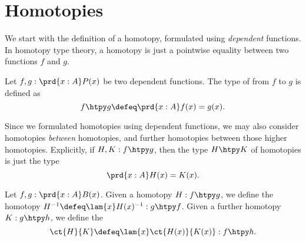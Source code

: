 \section{Homotopies}
We start with the definition of a homotopy, formulated using \emph{dependent} functions. In homotopy type theory, a homotopy is just a pointwise equality between two functions $f$ and $g$.

\begin{defn}
Let $f,g:\prd{x:A}P(x)$ be two dependent functions. The type of  from $f$ to $g$ is defined as
\begin{equation*}
f\htpy g \defeq \prd{x:A} f(x)=g(x).
\end{equation*}
\end{defn}

Since we formulated homotopies using dependent functions, we may also consider homotopies \emph{between} homotopies, and further homotopies between those higher homotopies. 
Explicitly, if $H,K:f\htpy g$, then the type $H\htpy K$ of homotopies is just the type
\begin{equation*}
\prd{x:A} H(x)=K(x).
\end{equation*}

\begin{defn}
Let $f,g:\prd{x:A}B(x)$. Given a homotopy $H:f\htpy g$, we define the  homotopy $H^{-1}\defeq \lam{x}H(x)^{-1}:g\htpy f$. Given a further homotopy $K:g\htpy h$, we define the  
\begin{equation*}
\ct{H}{K}\defeq\lam{x}\ct{H(x)}{K(x)}:f\htpy h.
\end{equation*}
\end{defn}

\begin{comment}
\begin{defn}
We define the following \define{whiskering} operations on homotopies:
\begin{enumerate}
\item Suppose $H:f\htpy g$ for two functions $f,g:A\to B$, and let $h:B\to C$. We define
\begin{equation*}
hH\defeq \lam{x}\ap{h}{H(x)}:h\circ f\htpy h\circ g.
\end{equation*}
\item Suppose $f:A\to B$ and $H:g\htpy h$ for two functions $g,h:B\to C$. We define
\begin{equation*}
Hf\defeq\lam{x}H(f(x)):h\circ f\htpy g\circ f.
\end{equation*}
\end{enumerate}
\end{defn}
\end{comment}

